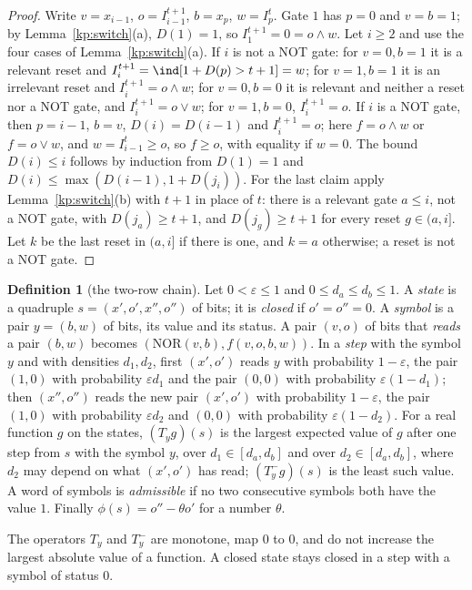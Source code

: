 \documentclass[11pt]{amsart}
\theoremstyle{definition}
\newtheorem{definition}[theorem]{Definition}
\theoremstyle{remark}
\newcommand{\eps}{\varepsilon}
\newcommand{\NOR}{\mathrm{NOR}}
\begin{document}
\begin{proof}
Write $v=x_{i-1}$, $o=I^{t+1}_{i-1}$, $b=x_p$, $w=I^t_p$. Gate $1$ has $p=0$ and
$v=b=1$; by Lemma~\ref{kp:switch}(a), $D(1)=1$, so $I^{t+1}_1=0=o\wedge w$. Let $i\ge2$ and use
the four cases of Lemma~\ref{kp:switch}(a). If $i$ is not a NOT gate: for $v=0,b=1$ it is a
relevant reset and $I^{t+1}_i=\ind[1+D(p)>t+1]=w$; for $v=1,b=1$ it is an irrelevant reset and
$I^{t+1}_i=o\wedge w$; for $v=0,b=0$ it is relevant and neither a reset nor a NOT gate, and
$I^{t+1}_i=o\vee w$; for $v=1,b=0$, $I^{t+1}_i=o$. If $i$ is a NOT gate, then $p=i-1$, $b=v$,
$D(i)=D(i-1)$ and $I^{t+1}_i=o$; here $f=o\wedge w$ or $f=o\vee w$, and $w=I^t_{i-1}\ge o$, so
$f\ge o$, with equality if $w=0$. The bound $D(i)\le i$ follows by induction from $D(1)=1$ and
$D(i)\le\max(D(i-1),1+D(j_i))$. For the last claim apply Lemma~\ref{kp:switch}(b) with $t+1$ in
place of $t$: there is a relevant gate $a\le i$, not a NOT gate, with $D(j_a)\ge t+1$, and
$D(j_g)\ge t+1$ for every reset $g\in(a,i]$. Let $k$ be the last reset in $(a,i]$ if there is
one, and $k=a$ otherwise; a reset is not a NOT gate.
\end{proof}

\begin{definition}[the two-row chain]\label{def:tworow}
Let $0<\eps\le1$ and $0\le d_a\le d_b\le1$. A \emph{state} is a quadruple
$s=(x',o',x'',o'')$ of bits; it is \emph{closed} if $o'=o''=0$. A \emph{symbol} is a pair
$y=(b,w)$ of bits, its value and its status. A pair $(v,o)$ of bits that \emph{reads} a pair
$(b,w)$ becomes $(\NOR(v,b),f(v,o,b,w))$. In a \emph{step} with the symbol $y$ and with
densities $d_1,d_2$, first $(x',o')$ reads $y$ with probability $1-\eps$, the pair $(1,0)$ with
probability $\eps d_1$ and the pair $(0,0)$ with probability $\eps(1-d_1)$; then $(x'',o'')$
reads the new pair $(x',o')$ with probability $1-\eps$, the pair $(1,0)$ with probability
$\eps d_2$ and $(0,0)$ with probability $\eps(1-d_2)$. For a real function $g$ on the states,
$(T_yg)(s)$ is the largest expected value of $g$ after one step from $s$ with the symbol $y$,
over $d_1\in[d_a,d_b]$ and over $d_2\in[d_a,d_b]$, where $d_2$ may depend on what $(x',o')$ has
read; $(T^-_yg)(s)$ is the least such value. A word of symbols is \emph{admissible} if no two
consecutive symbols both have the value $1$. Finally $\phi(s)=o''-\theta o'$ for a number
$\theta$.
\end{definition}

\noindent The operators $T_y$ and $T^-_y$ are monotone, map $0$ to $0$, and do not increase the
largest absolute value of a function. A closed state stays closed in a step with a symbol of
status $0$.
\end{document}
